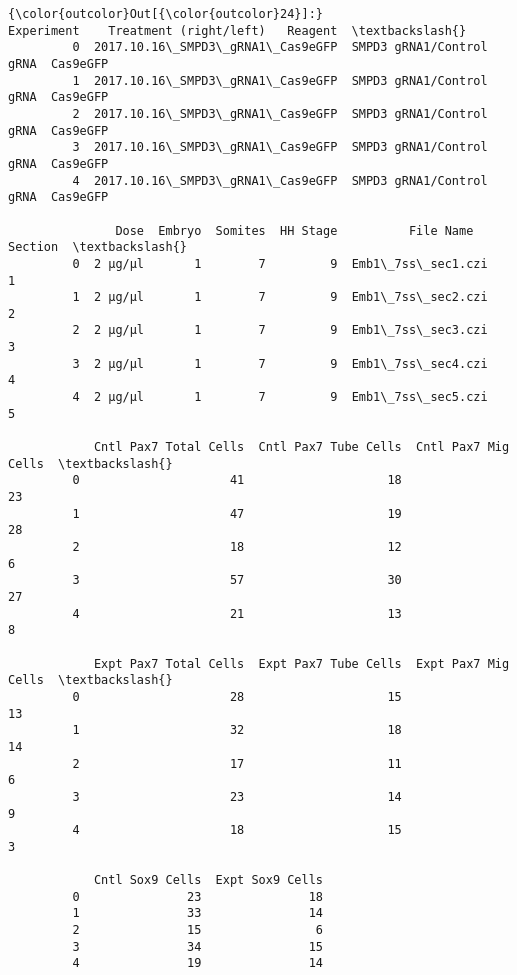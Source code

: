 \documentclass[11pt]{article}
\begin{document}
\begin{Verbatim}[commandchars=\\\{\}]
{\color{outcolor}Out[{\color{outcolor}24}]:}                         Experiment    Treatment (right/left)   Reagent  \textbackslash{}
         0  2017.10.16\_SMPD3\_gRNA1\_Cas9eGFP  SMPD3 gRNA1/Control gRNA  Cas9eGFP   
         1  2017.10.16\_SMPD3\_gRNA1\_Cas9eGFP  SMPD3 gRNA1/Control gRNA  Cas9eGFP   
         2  2017.10.16\_SMPD3\_gRNA1\_Cas9eGFP  SMPD3 gRNA1/Control gRNA  Cas9eGFP   
         3  2017.10.16\_SMPD3\_gRNA1\_Cas9eGFP  SMPD3 gRNA1/Control gRNA  Cas9eGFP   
         4  2017.10.16\_SMPD3\_gRNA1\_Cas9eGFP  SMPD3 gRNA1/Control gRNA  Cas9eGFP   
         
               Dose  Embryo  Somites  HH Stage          File Name  Section  \textbackslash{}
         0  2 µg/µl       1        7         9  Emb1\_7ss\_sec1.czi        1   
         1  2 µg/µl       1        7         9  Emb1\_7ss\_sec2.czi        2   
         2  2 µg/µl       1        7         9  Emb1\_7ss\_sec3.czi        3   
         3  2 µg/µl       1        7         9  Emb1\_7ss\_sec4.czi        4   
         4  2 µg/µl       1        7         9  Emb1\_7ss\_sec5.czi        5   
         
            Cntl Pax7 Total Cells  Cntl Pax7 Tube Cells  Cntl Pax7 Mig Cells  \textbackslash{}
         0                     41                    18                   23   
         1                     47                    19                   28   
         2                     18                    12                    6   
         3                     57                    30                   27   
         4                     21                    13                    8   
         
            Expt Pax7 Total Cells  Expt Pax7 Tube Cells  Expt Pax7 Mig Cells  \textbackslash{}
         0                     28                    15                   13   
         1                     32                    18                   14   
         2                     17                    11                    6   
         3                     23                    14                    9   
         4                     18                    15                    3   
         
            Cntl Sox9 Cells  Expt Sox9 Cells  
         0               23               18  
         1               33               14  
         2               15                6  
         3               34               15  
         4               19               14  
\end{Verbatim}
            
\end{document}
